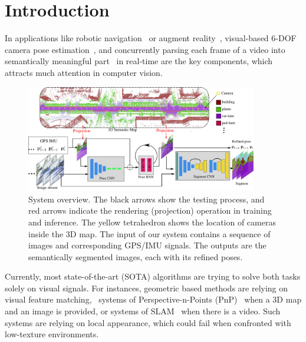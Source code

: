 
\vspace{-0.6\baselineskip}
\section{Introduction}
\vspace{-0.3\baselineskip}
\label{sec:introduction}
In applications like robotic navigation~\cite{ohno2003outdoor} or augment reality~\cite{DBLP:journals/corr/abs-1708-05006}, visual-based 6-DOF camera pose estimation~\cite{campbell2017globally,moreno2008pose,Kendall_2015_ICCV,coskun2017long}, and concurrently parsing each frame of a video into semantically meaningful part~\cite{ZhaoSQWJ16,WuSH16e,ChenPSA17} in real-time are the key components, which attracts much attention in computer vision.

\begin{figure}[t]
\center
\includegraphics[width=0.9\textwidth]{fig/framework.pdf}
\caption{System overview. The black arrows show the testing process, and red arrows indicate the rendering (projection) operation in training and inference. The yellow tetrahedron shows the location of cameras inside the 3D map. The input of our system contains a sequence of images and corresponding GPS/IMU signals. The outputs are the semantically segmented images, each with its refined poses.}
\label{fig:framework}
\vspace{-1\baselineskip}
\end{figure}

Currently, most state-of-the-art (SOTA) algorithms are trying to solve both tasks solely on visual signals.
For instances, geometric based methods are relying on visual feature matching, \eg~systems of Perspective-n-Points (PnP)~\cite{haralick1994review,kneip2014upnp,campbell2017globally} when a 3D map and an image is provided, or systems of SLAM~\cite{engel2014lsd,mur2015orb,NewcombeLD11} when there is a video. Such systems are relying on local appearance, which could fail when confronted with low-texture environments.

